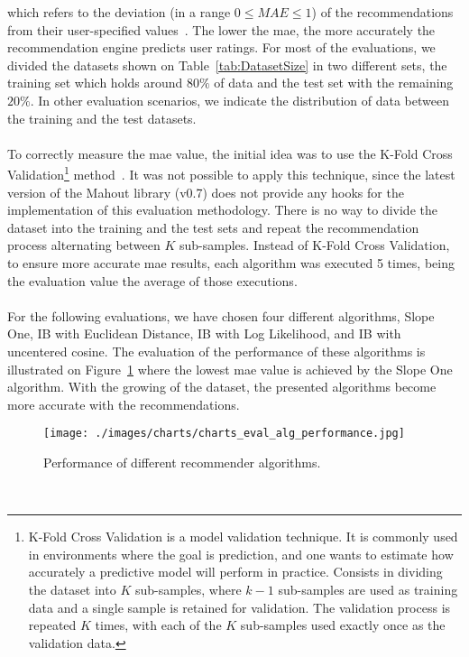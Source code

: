 which refers to the deviation (in a range $0 \le MAE \le 1$) of the recommendations from their user-specified values~\cite{ibCollabrativeVSGK}. The lower the \gls{mae}, the more accurately the recommendation engine predicts user ratings. For most of the evaluations, we divided the datasets shown on Table~\ref{tab:DatasetSize} in two different sets, the training set which holds around $80\%$ of data and the test set with the remaining $20\%$. In other evaluation scenarios, we indicate the distribution of data between the training and the test datasets.\\
\\
To correctly measure the \gls{mae} value, the initial idea was to use the K-Fold Cross Validation\footnote{K-Fold Cross Validation is a model validation technique. It is commonly used in environments where the goal is prediction, and one wants to estimate how accurately a predictive model will perform in practice. Consists in dividing the dataset into $K$ sub-samples, where $k-1$ sub-samples are used as training data and a single sample is retained for validation. The validation process is repeated $K$ times, with each of the $K$ sub-samples used exactly once as the validation data.} method~\cite{Duda_Book}. It was not possible to apply this technique, since the latest version of the Mahout library (v0.7) does not provide any hooks for the implementation of this evaluation methodology. There is no way to divide the dataset into the training and the test sets and repeat the recommendation process alternating between $K$ sub-samples. Instead of K-Fold Cross Validation, to ensure more accurate \gls{mae} results, each algorithm was executed 5 times, being the evaluation value the average of those executions.\\
\\
For the following evaluations, we have chosen four different algorithms, Slope One, IB with Euclidean Distance, IB with Log Likelihood, and IB with uncentered cosine. The evaluation of the performance of these algorithms is illustrated on Figure~\ref{fig:chartEvalPerformance} where the lowest \gls{mae} value is achieved by the Slope One algorithm. With the growing of the dataset, the presented algorithms become more accurate with the recommendations.\\
\begin{figure}[h!]
 \centering
   \texttt{[image: ./images/charts/charts\_eval\_alg\_performance.jpg]}
   \caption{Performance of different recommender algorithms.}
   \label{fig:chartEvalPerformance}
\end{figure}\\
